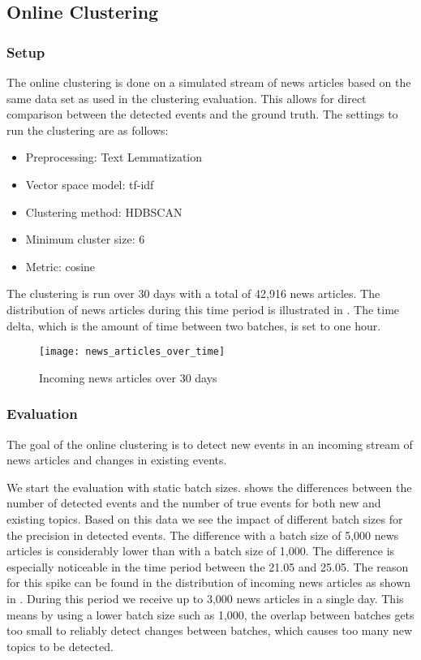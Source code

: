 \subsection{Online Clustering}
\label{subsec:5b_online_clustering}

\subsubsection{Setup}
\label{subsubsec:5b_setup}

The online clustering is done on a simulated stream of news articles
based on the same data set as used in the clustering evaluation.
This allows for direct comparison between the detected events and the ground truth.
The settings to run the clustering are as follows:

\begin{itemize}
    \item Preprocessing: Text Lemmatization
    \item Vector space model: tf-idf
    \item Clustering method: HDBSCAN
    \item Minimum cluster size: 6
    \item Metric: cosine
\end{itemize}

The clustering is run over 30 days with a total of 42,916 news articles.
The distribution of news articles during this time period is illustrated in .
The time delta, which is the amount of time between two batches, is set to one hour.

\begin{figure}[h]
    \centering
    \texttt{[image: news\_articles\_over\_time]}
    \caption{Incoming news articles over 30 days}
    \label{fig:news_articles_over_time}
\end{figure}

\subsubsection{Evaluation}
\label{subsubsec:5b_evaluation}

The goal of the online clustering is to detect new events in an incoming stream
of news articles and changes in existing events.

We start the evaluation with static batch sizes.
 shows the differences between the number of detected events
and the number of true events for both new and existing topics.
Based on this data we see the impact of different batch sizes for the precision in detected events.
The difference with a batch size of 5,000 news articles is considerably lower than with a batch size of 1,000.
The difference is especially noticeable in the time period between the 21.05 and 25.05.
The reason for this spike can be found in the distribution of incoming news articles
as shown in .
During this period we receive up to 3,000 news articles in a single day.
This means by using a lower batch size such as 1,000,
the overlap between batches gets too small to reliably detect changes between batches,
which causes too many new topics to be detected.

